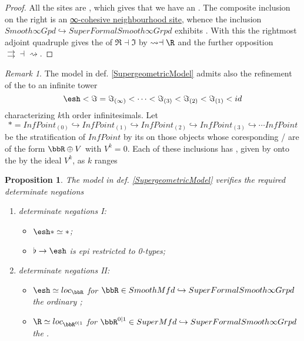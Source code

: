 \documentclass[12pt,titlepage]{article}
\newcommand{\lt}{<}
\theoremstyle{plain}
\newtheorem{prop}{Proposition}
\theoremstyle{definition}
\theoremstyle{remark}
\newtheorem{remark}{Remark}
\begin{document}
\begin{proof}
All the sites are , which gives that we have an . The composite inclusion on the right is an \href{http://ncatlab.org/nlab/show/differential+cohesive+%28infinity%2C1%29-topos#PresentationOnInfinitesimalNeighbourhoodSites}{∞-cohesive neighbourhood site}, whence the inclusion $Smooth\infty Gpd\hookrightarrow SuperFormalSmooth\infty Grpd$ exhibits \LabRef{nLab}{differential cohesion}.
With this the rightmost adjoint quadruple gives the  of $\Re \dashv \Im$ by $\rightsquigarrow \dashv \R$ and the further opposition $\rightrightarrows \dashv \rightsquigarrow$.
\end{proof}
\begin{remark}
\label{}\hypertarget{}{}
The model in def. \ref{SupergeometricModel} admits also the refinement of the  to an infinite tower
\begin{displaymath}
\esh 
\lt
\Im
=
\Im_{(\infty)}
\lt
\cdots
\lt
\Im_{(3)}
\lt
\Im_{(2)}
\lt
\Im_{(1)}
\lt
id
\end{displaymath}
characterizing $k$th order infinitesimals. Let
\begin{displaymath}
\ast
=
InfPoint_{(0)}
\hookrightarrow
InfPoint_{(1)}
\hookrightarrow
InfPoint_{(2)}
\hookrightarrow
InfPoint_{(3)}
\hookrightarrow
\cdots
InfPoint
\end{displaymath}
be the stratification of $InfPoint$ by its  on those objects whose coresponding / are of the form $\bbR \oplus V$ with $V^k = 0$. Each of these inclusions has , given by  onto the  by the ideal $V^k$, as $k$ ranges
\end{remark}
\begin{prop}
\label{DeterminateNegationsRealized}\hypertarget{DeterminateNegationsRealized}{}
The model in def. \ref{SupergeometricModel} verifies the required determinate negations
\begin{enumerate}%
\item determinate negations I:
\begin{itemize}%
\item $\esh  \ast \simeq \ast$;
\item $\flat \to \esh $ is epi restricted to 0-types;
\end{itemize}
\item determinate negations II:
\begin{itemize}%
\item $\esh  \simeq loc_{\bbR}$ for $\bbR \in SmoothMfd \hookrightarrow SuperFormalSmooth\infty Grpd$ the ordinary ;
\item $\R \simeq loc_{\bbR^{0|1}}$ for $\bbR^{0|1} \in SuperMfd \hookrightarrow SuperFormalSmooth\infty Grpd$ the .
\end{itemize}
\end{enumerate}
\end{prop}
\end{document}
